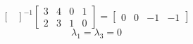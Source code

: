 \documentclass[../../main.tex]{subfiles}
\begin{document}
\begin{solution}
\begin{enumerate}
\begin{equation*}
\begin{bmatrix}
                  \end{bmatrix}^{-1}
                  \begin{bmatrix}
                      3 & 4 & 0 & 1 \\
                      2 & 3 & 1 & 0
                  \end{bmatrix}
                  =
                  \begin{bmatrix}
                      0 & 0 & -1 & -1
                  \end{bmatrix}
              \end{equation*}
              \begin{equation*}
                  \lambda_1 = \lambda_3 = 0
              \end{equation*}
    \end{enumerate}
\end{solution}
\end{document}
